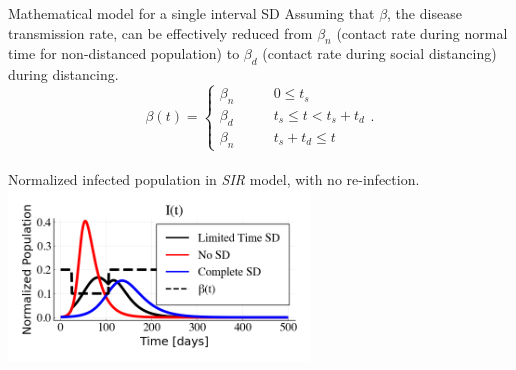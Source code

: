 \documentclass[10pt]{beamer}
\begin{document}
\begin{frame}{Mathematical model for a single interval SD}
	Assuming that $\beta$, the disease transmission rate, can be effectively reduced from $\beta_{n}$ (contact rate during normal time for non-distanced population) to $\beta_{d}$ (contact rate during social distancing) during distancing. \\ \vspace{0.5cm}
	\begin{equation} \label{eq:beta}
		\beta(t) = \left\{
		\begin{matrix} 
			\beta_n & \qquad 0 \leq t_s \\ 
			\beta_d & \qquad t_s \leq t < t_s+t_d \\
			\beta_n  & \qquad t_s+t_d \leq t 
		\end{matrix}
		\right. .
	\end{equation} \\ \vspace{0.5cm}
	Normalized infected population in \textit{SIR} model, with no re-infection. \\
	\hspace{2cm} \includegraphics[width=0.6\textwidth]{epidemic-sd.png}\\
\end{frame}
\end{document}
